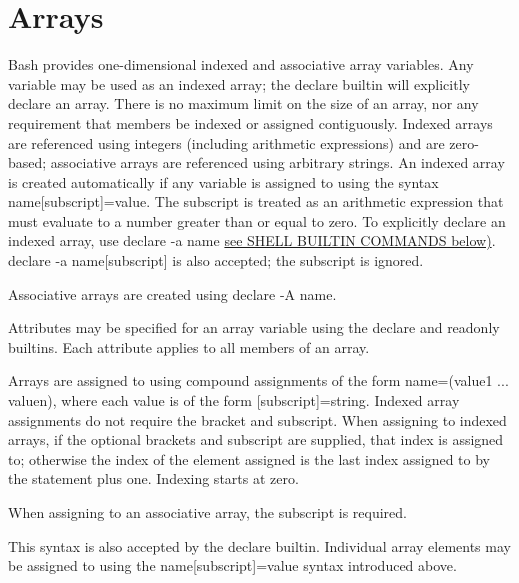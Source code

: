 \section{Arrays}\label{sec:arrays}

Bash provides one-dimensional indexed and associative array variables. Any variable may be used as an indexed array; the declare builtin will explicitly declare an array. There is no maximum limit on the size of an array, nor any requirement that members be indexed or assigned contiguously. Indexed arrays are referenced using integers (including arithmetic expressions) and are zero-based; associative arrays are referenced using arbitrary strings.
An indexed array is created automatically if any variable is assigned to using the syntax name[subscript]=value. The subscript is treated as an arithmetic expression that must evaluate to a number greater than or equal to zero. To explicitly declare an indexed array, use declare -a name \hyperref[sec:shellbuiltincommands]{see SHELL BUILTIN COMMANDS below)}. declare -a name[subscript] is also accepted; the subscript is ignored.

Associative arrays are created using declare -A name.

Attributes may be specified for an array variable using the declare and readonly builtins. Each attribute applies to all members of an array.

Arrays are assigned to using compound assignments of the form name=(value1 ... valuen), where each value is of the form [subscript]=string. Indexed array assignments do not require the bracket and subscript. When assigning to indexed arrays, if the optional brackets and subscript are supplied, that index is assigned to; otherwise the index of the element assigned is the last index assigned to by the statement plus one. Indexing starts at zero.

When assigning to an associative array, the subscript is required.

This syntax is also accepted by the declare builtin. Individual array elements may be assigned to using the name[subscript]=value syntax introduced above.

